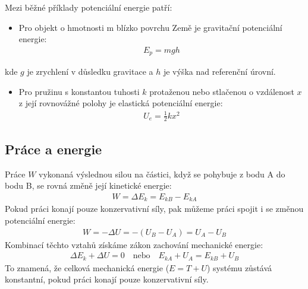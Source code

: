 \documentclass[letterpaper,10pt,english]{jupyterBook}
\begin{document}
\sphinxAtStartPar
Mezi běžné příklady potenciální energie patří:
\begin{itemize}
\item {} 
\sphinxAtStartPar
{} Pro objekt o hmotnosti m blízko povrchu Země je gravitační potenciální energie:
\begin{equation*}
\begin{split}E_p = mgh\end{split}
\end{equation*}
\end{itemize}

\sphinxAtStartPar
kde \(g\) je zrychlení v důsledku gravitace a \(h\) je výška nad referenční úrovní.
\begin{itemize}
\item {} 
\sphinxAtStartPar
{} Pro pružinu s konstantou tuhosti \(k\) protaženou nebo stlačenou o vzdálenost \(x\) z její rovnovážné polohy je elastická potenciální energie:
\begin{equation*}
\begin{split}U_e = \frac{1}{2} k x^2\end{split}
\end{equation*}
\end{itemize}


\subsection{Práce a energie}
\label{\detokenize{Prednasky/1_4_Energie:prace-a-energie}}
\sphinxAtStartPar
Práce \(W\) vykonaná výslednou silou na částici, když se pohybuje z bodu A do bodu B, se rovná změně její kinetické energie:
\begin{equation*}
\begin{split} W = \Delta E_k = E_{kB} - E_{kA} \end{split}
\end{equation*}
\sphinxAtStartPar
Pokud práci konají pouze konzervativní síly, pak můžeme práci spojit i se změnou potenciální energie:
\begin{equation*}
\begin{split} W = -\Delta U = -(U_B - U_A) = U_A - U_B\end{split}
\end{equation*}
\sphinxAtStartPar
Kombinací těchto vztahů získáme zákon zachování mechanické energie:
\begin{equation*}
\begin{split}\Delta E_k + \Delta U = 0  \quad \text{nebo} \quad E_{kA} + U_A =E_{kB} + U_B\end{split}
\end{equation*}
\sphinxAtStartPar
To znamená, že celková mechanická energie (\(E=T+U\)) systému zůstává konstantní, pokud práci konají pouze konzervativní síly.
\end{document}
